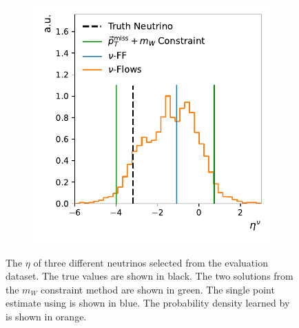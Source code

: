 \begin{figure}[ht]
\begin{subfigure}{0.32\textwidth}
    \caption{} \label{fig:inf_ambig}
    \end{subfigure}
    \begin{subfigure}{0.32\textwidth}
        \includegraphics[width=\textwidth]{Figures/neutrino_unfolding/eta_12.pdf}
        \caption{} \label{fig:inf_bad}
    \end{subfigure}
    \caption{The $\eta$ of three different neutrinos selected from the evaluation dataset. The true values are shown in black. The two solutions from the $m_W$ constraint method are shown in green. The single point estimate using \nuff{} is shown in blue. The probability density learned by \nuflow{} is shown in orange.}
    \label{fig:inference}
\end{figure}

